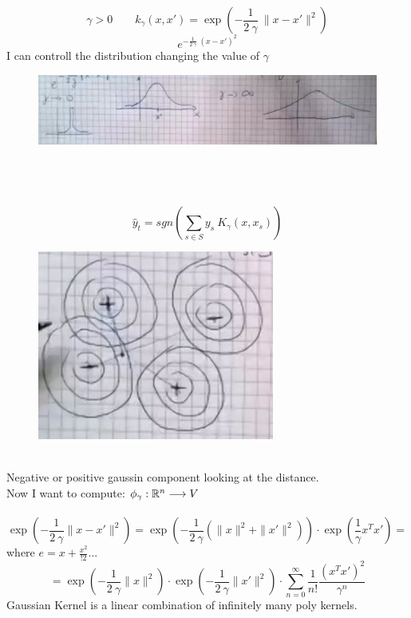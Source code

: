 \documentclass[../main.tex]{subfiles}
\begin{document}
$$\gamma > 0 \qquad k_{\gamma} (x, x') = \exp \left( - \frac{1}{2 \ \gamma} \ \| x- x' \|^2 \right)
$$
$$
e^{- \frac{1}{2 \ \gamma} \ \left(x - x' \right) ^2}
$$
I can controll the distribution changing the value of $\gamma$
\begin{figure}[h]
    \centering
    \includegraphics[width=0.8\linewidth]{../img/lez17-img2.JPG}
    \caption{} 
\end{figure}\\\\\\
$$
\hat{y}_t = sgn \left( \sum_{s \in S} y_s \ K_{\gamma} (x, x_s) \right)
$$
\begin{figure}[h]
    \centering
    \includegraphics[width=0.6\linewidth]{../img/lez17-img3.JPG}
    \caption{} 
\end{figure}\\
Negative or positive gaussin component looking at the distance. 
\\
Now I want to compute: $ \phi_\gamma : \mathbb{R}^n \longrightarrow V$
\\\\
$$
\exp \left( - \frac{1}{2 \ \gamma} \| x- x'\|^2 \right) = \exp \left(  - \frac{1}{2 \ \gamma} \left( \| x \|^2 + \| x'\|^2 \right) \right) \cdot \exp \left( \frac{1}{\gamma} x^T x'\right) =
$$
where $e = x+ \frac{x^2}{!2} ... $
$$
= \exp \left(  - \frac{1}{2 \ \gamma} \| x \|^2 \right) \cdot \exp \left(  - \frac{1}{2 \ \gamma} \| x' \|^2 \right) \cdot \sum_{n=0}^{\infty} \frac{1}{n! } \frac{\left( x^T x' \right)^2}{\gamma^n}
$$
Gaussian Kernel is a linear combination of infinitely many poly kernels.
\\
\end{document}
